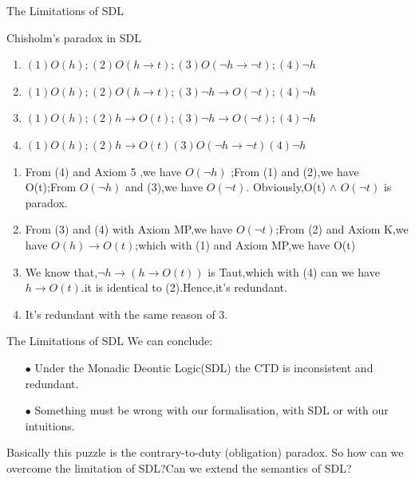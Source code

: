 \documentclass{beamer}
\begin{document}
\begin{frame}{The Limitations of SDL}
\begin{block}{Chisholm's paradox in SDL}
\begin{enumerate}
\item $(1)O(h);(2)O(h\to t);(3)O(\neg h\to \neg t);(4) \neg h$
\item $(1)O(h);(2)O(h \to t);(3) \neg h \to O (\neg t); (4) \neg h$
\item $(1)O(h);(2)h\to O(t);(3)\neg h \to O(\neg t) ;(4)\neg h $
\item $ (1)O(h);(2)h\to O(t)(3)O(\neg h\to \neg t)(4)\neg h$
\end{enumerate}
\end{block}
\begin{enumerate}
\item From (4) and Axiom 5 ,we have $O(\neg h) $ ;From (1) and (2),we have O(t);From $O(\neg h)$ and (3),we have $ O(\neg t)$. Obviously,O(t) $\wedge$ $O(\neg t)$ is paradox.
\item From (3) and (4) with Axiom MP,we have $O(\neg t)$;From (2) and Axiom K,we have $O(h)\to O(t) $;which with (1) and Axiom MP,we have O(t)
\item We know that,$ \neg h \to (h \to O(t))$ is Taut,which with (4) can we have $ h \to O(t)$.it is identical to (2).Hence,it's redundant.
\item It's redundant with the same reason of 3.
\end{enumerate}
\end{frame}
\begin{frame}{The Limitations of SDL}
We can conclude:
\begin{enumerate}
\item[$\bullet$] Under the Monadic Deontic Logic(SDL) the CTD is inconsistent and redundant.
\item[$\bullet$] Something must be wrong with our formalisation, with SDL or with our intuitions.  
\end{enumerate}
Basically this puzzle is the contrary-to-duty (obligation) paradox.\newline\newline
So how can we overcome the limitation of SDL?Can we extend the semantics of SDL?
\end{frame}
\end{document}
